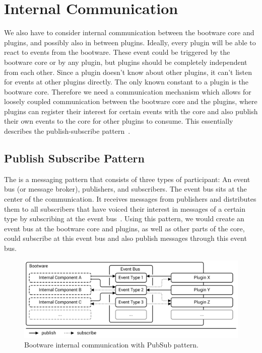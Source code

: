 \section{Internal Communication}
\label{design:internalcomm}

We also have to consider internal communication between the bootware core and plugins, and possibly also in between plugins.
Ideally, every plugin will be able to react to events from the bootware.
These event could be triggered by the bootware core or by any plugin, but plugins should be completely independent from each other.
Since a plugin doesn't know about other plugins, it can't listen for events at other plugins directly.
The only known constant to a plugin is the bootware core.
Therefore we need a communication mechanism which allows for loosely coupled communication between the bootware core and the plugins, where plugins can register their interest for certain events with the core and also publish their own events to the core for other plugins to consume.
This essentially describes the publish-subscribe pattern~\autocite{pubsub}.

\subsection{Publish Subscribe Pattern}

The  is a messaging pattern that consists of three types of participant: An event bus (or message broker), publishers, and subscribers.
The event bus sits at the center of the communication.
It receives messages from publishers and distributes them to all subscribers that have voiced their interest in messages of a certain type by subscribing at the event bus~\autocite{pubsub}.
Using this pattern, we would create an event bus at the bootware core and plugins, as well as other parts of the core, could subscribe at this event bus and also publish messages through this event bus.

\begin{figure}[!htbp]
	\centering
	\includegraphics[resolution=600]{design/assets/pubsub}
	\caption{Bootware internal communication with PubSub pattern.}
	\label{image:pubsub}
\end{figure}


